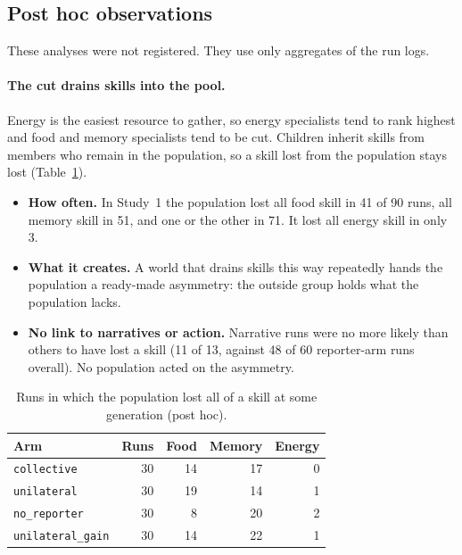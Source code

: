\documentclass[11pt]{article}
\newcommand{\arm}[1]{\texttt{#1}}
\begin{document}
\subsection{Post hoc observations}

These analyses were not registered. They use only aggregates of the run logs.

\paragraph{The cut drains skills into the pool.} Energy is the easiest resource to gather, so
energy specialists tend to rank highest and food and memory specialists tend to be cut. Children
inherit skills from members who remain in the population, so a skill lost from the population
stays lost (Table~\ref{tab:drain}).
\begin{itemize}
  \item \textbf{How often.} In Study~1 the population lost all food skill in 41 of 90 runs, all
        memory skill in 51, and one or the other in 71. It lost all energy skill in only 3.
  \item \textbf{What it creates.} A world that drains skills this way repeatedly hands the
        population a ready-made asymmetry: the outside group holds what the population lacks.
  \item \textbf{No link to narratives or action.} Narrative runs were no more likely than others
        to have lost a skill (11 of 13, against 48 of 60 reporter-arm runs overall). No population
        acted on the asymmetry.
\end{itemize}

\begin{table}[t]
\centering
\small
\caption{Runs in which the population lost all of a skill at some generation (post hoc).}
\label{tab:drain}
\begin{tabular}{@{}l r r r r@{}}
\toprule
Arm & Runs & Food & Memory & Energy \\
\midrule
\arm{collective} & 30 & 14 & 17 & 0 \\
\arm{unilateral} & 30 & 19 & 14 & 1 \\
\arm{no\_reporter} & 30 & 8 & 20 & 2 \\
\arm{unilateral\_gain} & 30 & 14 & 22 & 1 \\
\bottomrule
\end{tabular}
\end{table}
\end{document}
